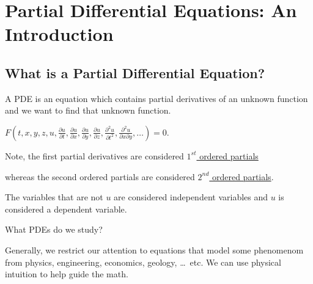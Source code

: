 \section{Partial Differential Equations: An Introduction}
\subsection{What is a Partial Differential Equation?}

A PDE is an equation which contains partial derivatives of an unknown function and we want to find that unknown function.

\Ex $F(
t, x, y, z, u,
\frac{\partial u}{\partial t},
\frac{\partial u}{\partial x},
\frac{\partial u}{\partial y},
\frac{\partial u}{\partial z},
\frac{\partial^2 u}{\partial t^2},
\frac{\partial^2 u}{\partial x \partial y},
\ldots
) = 0$.

Note, the first partial derivatives are considered \underline{$1^{st}$ ordered partials}

whereas the second ordered partials are considered \underline{$2^{nd}$ ordered partials}.

The variables that are not $u$ are considered independent variables and $u$ is considered a dependent variable.

What PDEs do we study?

Generally, we restrict our attention to equations that model some phenomenom from physics, engineering, economics, geology, \ldots\ etc. We can use physical intuition to help guide the math.

